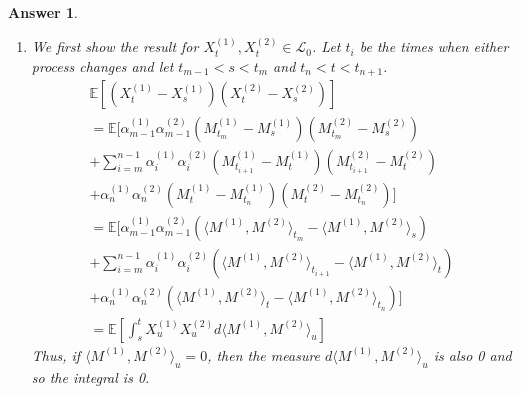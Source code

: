 \documentclass[12pt]{article}
\theoremstyle{colon}
\newtheorem*{answer}{Answer}
\begin{document}
\begin{answer}
\begin{enumerate}[label=\alph*)]
    \item We first show the result for $X_t^{(1)}, X_t^{(2)} \in \mathcal{L}_0$. Let $t_i$ be the times when either process changes and let $t_{m-1} < s < t_m$ and $t_n < t < t_{n+1}$.
      \begin{gather*}
        \mathbb{E} [(X_t^{(1)} - X_s^{(1)})(X_t^{(2)} - X_s^{(2)})] \\
        = \mathbb{E} [ \alpha^{(1)}_{m-1}\alpha^{(2)}_{m-1}(M_{t_m}^{(1)} - M_{s}^{(1)})(M_{t_m}^{(2)} - M_{s}^{(2)}) \\
          + \sum_{i=m}^{n-1}\alpha^{(1)}_{i}\alpha^{(2)}_{i}(M_{t_{i+1}}^{(1)} - M_{t}^{(1)})(M_{t_{i+1}}^{(2)} - M_{t}^{(2)}) \\
          + \alpha^{(1)}_{n}\alpha^{(2)}_{n}(M_{t}^{(1)} - M_{t_n}^{(1)})(M_{t}^{(2)} - M_{t_n}^{(2)}) ] \\
        = \mathbb{E} [ \alpha^{(1)}_{m-1}\alpha^{(2)}_{m-1} (\langle M^{(1)}, M^{(2)} \rangle_{t_m} -  \langle M^{(1)}, M^{(2)} \rangle_{s}) \\
          + \sum_{i=m}^{n-1}\alpha^{(1)}_{i}\alpha^{(2)}_{i} (\langle M^{(1)}, M^{(2)} \rangle_{t_{i+1}} -  \langle M^{(1)}, M^{(2)} \rangle_{t}) \\
          + \alpha^{(1)}_{n}\alpha^{(2)}_{n} (\langle M^{(1)}, M^{(2)} \rangle_{t} -  \langle M^{(1)}, M^{(2)} \rangle_{t_n})] \\
        = \mathbb{E}[ \int_s^t X_u^{(1)} X_u^{(2)} d \langle M^{(1)}, M^{(2)} \rangle_{u} ]
      \end{gather*}
      Thus, if $\langle M^{(1)}, M^{(2)} \rangle_{u} = 0$, then the measure $d \langle M^{(1)}, M^{(2)} \rangle_{u}$ is also 0 and so the integral is 0.


\end{enumerate}
\end{answer}
\end{document}
